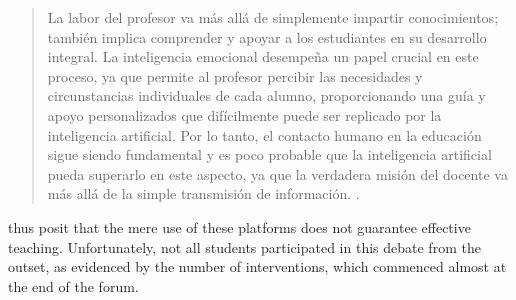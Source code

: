 \documentclass[english]{textolivre}
\begin{document}
\begin{quote}
    La labor del profesor va más allá de simplemente impartir conocimientos; también implica comprender y apoyar a los estudiantes en su desarrollo integral. La inteligencia emocional desempeña un papel crucial en este proceso, ya que permite al profesor percibir las necesidades y circunstancias individuales de cada alumno, proporcionando una guía y apoyo personalizados que difícilmente puede ser replicado por la inteligencia artificial. Por lo tanto, el contacto humano en la educación sigue siendo fundamental y es poco probable que la inteligencia artificial pueda superarlo en este aspecto, ya que la verdadera misión del docente va más allá de la simple transmisión de información.
    .
\end{quote}

\textcite{intria2023} thus posit that the mere use of these platforms does not guarantee effective teaching. Unfortunately, not all students participated in this debate from the outset, as evidenced by the number of interventions, which commenced almost at the end of the forum.
\end{document}
